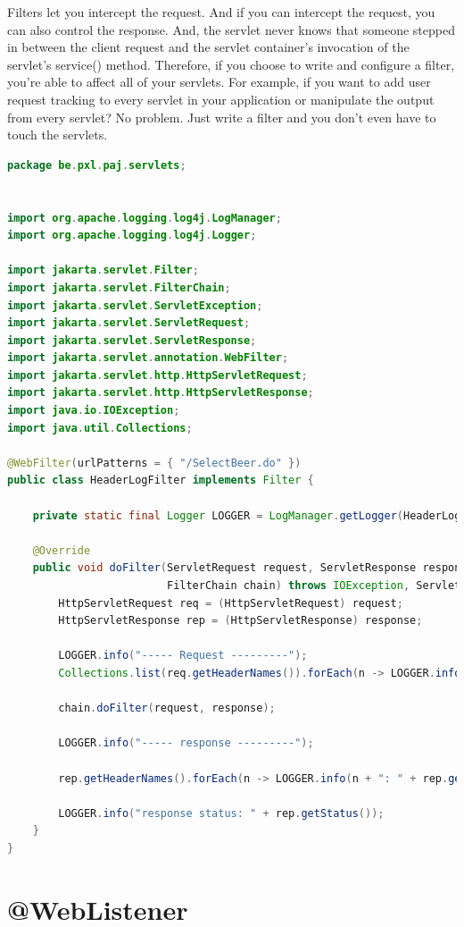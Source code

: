 Filters let you intercept the request.  And if you can intercept the request,
you can also control the response.  And, the servlet  never
knows that someone stepped in between the client request and the servlet container’s invocation 
of the servlet’s service() method.  Therefore,  if you choose to write and configure a filter, you're able to affect all of your servlets.  For example, if you want to add
user request tracking to every servlet in your application or manipulate the output
from every servlet? No problem.  Just write a filter and you don’t even have to touch the servlets.

\begin{lstlisting}[language=java, frame=single]
package be.pxl.paj.servlets;


import org.apache.logging.log4j.LogManager;
import org.apache.logging.log4j.Logger;

import jakarta.servlet.Filter;
import jakarta.servlet.FilterChain;
import jakarta.servlet.ServletException;
import jakarta.servlet.ServletRequest;
import jakarta.servlet.ServletResponse;
import jakarta.servlet.annotation.WebFilter;
import jakarta.servlet.http.HttpServletRequest;
import jakarta.servlet.http.HttpServletResponse;
import java.io.IOException;
import java.util.Collections;

@WebFilter(urlPatterns = { "/SelectBeer.do" })
public class HeaderLogFilter implements Filter {

	private static final Logger LOGGER = LogManager.getLogger(HeaderLogFilter.class);

	@Override
	public void doFilter(ServletRequest request, ServletResponse response,
	                     FilterChain chain) throws IOException, ServletException {
		HttpServletRequest req = (HttpServletRequest) request;
		HttpServletResponse rep = (HttpServletResponse) response;

		LOGGER.info("----- Request ---------");
		Collections.list(req.getHeaderNames()).forEach(n -> LOGGER.info(n + ": " + req.getHeader(n)));

		chain.doFilter(request, response);

		LOGGER.info("----- response ---------");

		rep.getHeaderNames().forEach(n -> LOGGER.info(n + ": " + rep.getHeader(n)));

		LOGGER.info("response status: " + rep.getStatus());
	}
}
\end{lstlisting}


\section{@WebListener}

